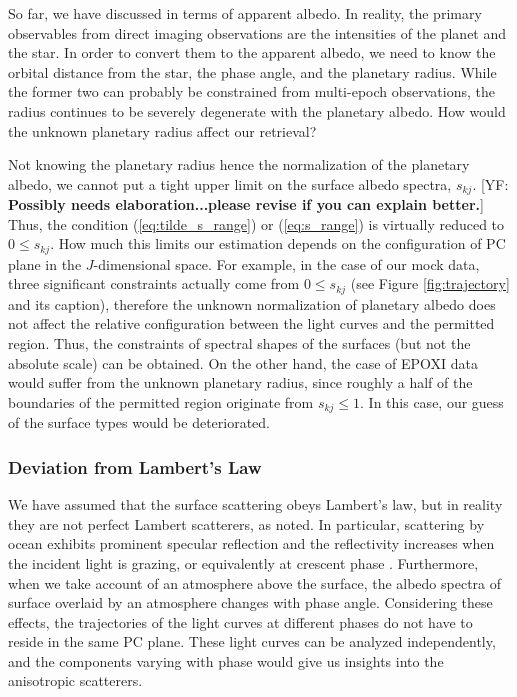 \documentclass[iop,numberedappendix,apj,]{emulateapj}
\def\memoYF#1{\color{red}[YF: {\bf #1}]\color{black}}
\begin{document}
So far, we have discussed in terms of apparent albedo. 
In reality, the primary observables from direct imaging observations are the intensities of the planet and the star. 
In order to convert them to the apparent albedo, we need to know the orbital distance from the star, the phase angle, and the planetary radius. 
While the former two can probably be constrained from multi-epoch observations, the radius continues to be severely degenerate with the planetary albedo. 
How would the unknown planetary radius affect our retrieval? 

Not knowing the planetary radius hence the normalization of the planetary albedo, we cannot put a tight upper limit on the surface albedo spectra, $s_{kj}$. \memoYF{Possibly needs elaboration...please revise if you can explain better.} 
Thus, the condition (\ref{eq:tilde_s_range}) or (\ref{eq:s_range}) is virtually reduced to $0 \leq s_{kj}$. 
How much this limits our estimation depends on the configuration of PC plane in the $J$-dimensional space. 
For example, in the case of our mock data, three significant constraints actually come from $0 \leq s_{kj}$ (see Figure \ref{fig:trajectory} and its caption), therefore the unknown normalization of planetary albedo does not affect the relative configuration between the light curves and the permitted region. 
Thus, the constraints of spectral shapes of the surfaces (but not the absolute scale) can be obtained. 
On the other hand, the case of EPOXI data would suffer from the unknown planetary radius, since roughly a half of the boundaries of the permitted region originate from $ s_{kj} \leq 1$. 
In this case, our guess of the surface types would be deteriorated. 


\subsubsection{Deviation from Lambert's Law}
\label{ss:deviate_Lambert}

We have assumed that the surface scattering obeys Lambert's law, but in reality they are not perfect Lambert scatterers, as noted. 
In particular, scattering by ocean exhibits prominent specular reflection and the reflectivity increases when the incident light is grazing, or equivalently at crescent phase \citep[e.g.,][]{Williams2008,Robinson2010,Robinson2014}. 
Furthermore, when we take account of an atmosphere above the surface, the albedo spectra of surface overlaid by an atmosphere changes with phase angle.  
Considering these effects, the trajectories of the light curves at different phases do not have to reside in the same PC plane. 
These light curves can be analyzed independently, and the components varying with phase would give us insights into the anisotropic scatterers. 
\end{document}
